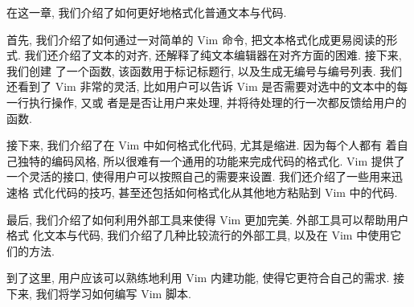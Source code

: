 在这一章, 我们介绍了如何更好地格式化普通文本与代码.

首先, 我们介绍了如何通过一对简单的 Vim 命令, 把文本格式化成更易阅读的形式.
我们还介绍了文本的对齐, 还解释了纯文本编辑器在对齐方面的困难. 接下来, 我们创建
了一个函数, 该函数用于标记标题行, 以及生成无编号与编号列表. 我们还看到了 Vim
非常的灵活, 比如用户可以告诉 Vim 是否需要对选中的文本中的每一行执行操作, 又或
者是是否让用户来处理, 并将待处理的行一次都反馈给用户的函数.

接下来, 我们介绍了在 Vim 中如何格式化代码, 尤其是缩进. 因为每个人都有
着自己独特的编码风格, 所以很难有一个通用的功能来完成代码的格式化. Vim 提供了
一个灵活的接口, 使得用户可以按照自己的需要来设置. 我们还介绍了一些用来迅速格
式化代码的技巧, 甚至还包括如何格式化从其他地方粘贴到 Vim 中的代码.

最后, 我们介绍了如何利用外部工具来使得 Vim 更加完美. 外部工具可以帮助用户格式
化文本与代码, 我们介绍了几种比较流行的外部工具, 以及在 Vim 中使用它们的方法.

到了这里, 用户应该可以熟练地利用 Vim 内建功能, 使得它更符合自己的需求. 接下来,
我们将学习如何编写 Vim 脚本.
